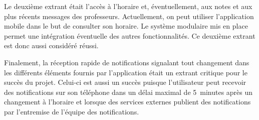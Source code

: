     Le deuxième extrant était l'accès à l'horaire et, éventuellement, aux notes et aux plus récents messages des professeurs. Actuellement, on peut utiliser l'application mobile dans le but de consulter son horaire. Le système modulaire mis en place permet une intégration éventuelle des autres fonctionnalités. Ce deuxième extrant est donc aussi considéré réussi.

    Finalement, la réception rapide de notifications signalant tout changement dans les différents éléments fournis par l'application était un extrant critique pour le succès du projet. Celui-ci est aussi un succès puisque l'utilisateur peut recevoir des notifications sur son téléphone dans un délai maximal de 5~minutes après un changement à l'horaire et lorsque des services externes publient des notifications par l'entremise de l'équipe des notifications.
    
    
    
    